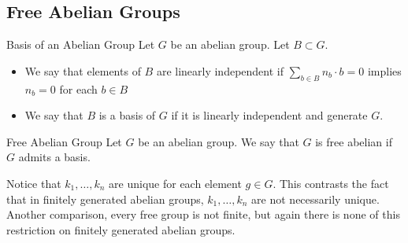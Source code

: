 \documentclass[a4paper]{article}
\begin{document}
\subsection{Free Abelian Groups}
\begin{defn}{Basis of an Abelian Group}{} Let $G$ be an abelian group. Let $B\subset G$. 
\begin{itemize}
\item We say that elements of $B$ are linearly independent if $\sum_{b\in B}n_b\cdot b=0$ implies $n_b=0$ for each $b\in B$
\item We say that $B$ is a basis of $G$ if it is linearly independent and generate $G$. 
\end{itemize}
\end{defn}

\begin{defn}{Free Abelian Group}{} Let $G$ be an abelian group. We say that $G$ is free abelian if $G$ admits a basis. 
\end{defn}

Notice that $k_1,\dots,k_n$ are unique for each element $g\in G$. This contrasts the fact that in finitely generated abelian groups, $k_1,\dots,k_n$ are not necessarily unique. \\
Another comparison, every free group is not finite, but again there is none of this restriction on finitely generated abelian groups. 
\end{document}
